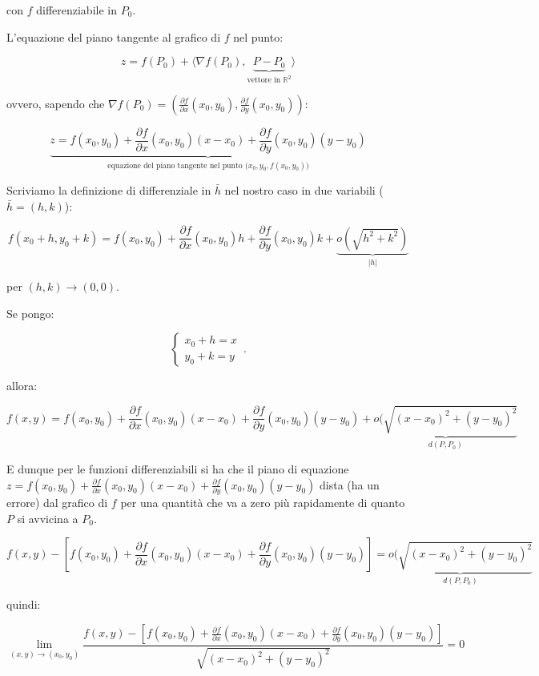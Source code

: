\documentclass[11pt]{article}
\begin{document}
con $f$ differenziabile in $P_0$.

L'equazione del piano tangente al grafico di $f$ nel punto:

\[
    z= f(P_0) + \langle \nabla f(P_0), \underbrace{P-P_0}_\text{vettore in $\mathbb{R}^{2}$} \rangle
\]

ovvero, sapendo che $\nabla f(P_0) = ( \frac{\partial f}{\partial x}(x_0,y_0), \frac{\partial f}{\partial y}(x_0,y_0))$:

\[
    \underbrace{z = f(x_0,y_0) + \frac{\partial f}{\partial x}(x_0,y_0) (x-x_0) + \frac{\partial f}{\partial y}(x_0,y_0) (y-y_0)}_\text{equazione del piano tangente nel punto ($x_0,y_0,f(x_0,y_0)$)}
\]


Scriviamo la definizione di differenziale in $\bar{h} $ nel nostro caso in due variabili ($\bar{h} =(h,k)$):

\[
    f(x_0+h,y_0+k) = f(x_0,y_0) + \frac{\partial f}{\partial x}(x_0,y_0) h + \frac{\partial f}{\partial y}(x_0,y_0) k + \underbrace{o(\sqrt{h^{2}+k^{2}})}_\text{$|h|$}
\]

per $(h,k) \rightarrow  (0,0)$.

Se pongo:

\begin{equation}
    \begin{cases}
           x_0+h = x\\
           y_0+ k = y
    \end{cases}\,.
\end{equation}

allora:

\[
    f(x,y) = f(x_0,y_0) + \frac{\partial f}{\partial x}(x_0,y_0) (x-x_0) + \frac{\partial f}{\partial y}(x_0,y_0) (y-y_0) + \underbrace{o(\sqrt{(x-x_0)^{2}+(y-y_0)^{2}}}_\text{$d(P,P_0)$}
\]

E dunque per le funzioni differenziabili si ha che il piano di equazione $z= f(x_0,y_0) + \frac{\partial f}{\partial x}(x_0,y_0)(x-x_0) + \frac{\partial f}{\partial y}(x_0,y_0) (y-y_0)$ dista (ha un errore) dal grafico di $f$ per una quantità che va a zero più rapidamente di quanto $P$ si avvicina a $P_0$.

\[
    f(x,y) - [f(x_0,y_0) + \frac{\partial f}{\partial x}(x_0,y_0) (x-x_0) + \frac{\partial f}{\partial y}(x_0,y_0) (y-y_0)] = \underbrace{o(\sqrt{(x-x_0)^{2}+(y-y_0)^{2}}}_\text{$d(P,P_0)$}
\]

quindi:

\[
    \lim_{ (x,y) \to (x_0,y_0) } \frac{f(x,y) - [f(x_0,y_0) + \frac{\partial f}{\partial x}(x_0,y_0) (x-x_0) + \frac{\partial f}{\partial y}(x_0,y_0) (y-y_0)] }{\sqrt{(x-x_0)^{2}+(y-y_0)^{2}}}= 0
\]
\end{document}
